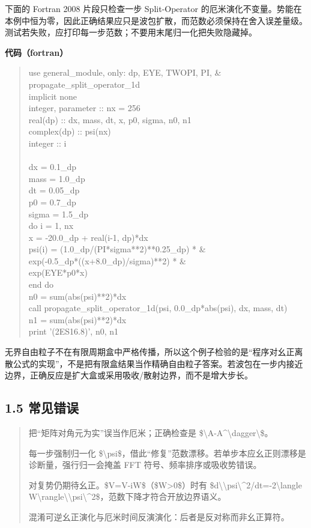 \documentclass[UTF8,openany,11pt,fontset=fandol]{ctexbook}
\begin{document}
下面的 Fortran 2008 片段只检查一步 Split-Operator
的厄米演化不变量。势能在本例中恒为零，因此正确结果应只是波包扩散，而范数必须保持在舍入误差量级。测试若失败，应打印每一步范数；不要用末尾归一化把失败隐藏掉。

\textbf{代码（fortran）}

\begin{quote}
use general\_module, only: dp, EYE, TWOPI, PI, \&\\
propagate\_split\_operator\_1d\\
implicit none\\
integer, parameter :: nx = 256\\
real(dp) :: dx, mass, dt, x, p0, sigma, n0, n1\\
complex(dp) :: psi(nx)\\
integer :: i\\
~\\
dx = 0.1\_dp\\
mass = 1.0\_dp\\
dt = 0.05\_dp\\
p0 = 0.7\_dp\\
sigma = 1.5\_dp\\
do i = 1, nx\\
x = -20.0\_dp + real(i-1, dp)*dx\\
psi(i) = (1.0\_dp/(PI*sigma**2)**0.25\_dp) * \&\\
exp(-0.5\_dp*((x+8.0\_dp)/sigma)**2) * \&\\
exp(EYE*p0*x)\\
end do\\
n0 = sum(abs(psi)**2)*dx\\
call propagate\_split\_operator\_1d(psi, 0.0\_dp*abs(psi), dx, mass,
dt)\\
n1 = sum(abs(psi)**2)*dx\\
print '(2ES16.8)', n0, n1
\end{quote}

无界自由粒子不在有限周期盒中严格传播，所以这个例子检验的是``程序对幺正离散公式的实现''，不是把有限盒结果当作精确自由粒子答案。若波包在一步内接近边界，正确反应是扩大盒或采用吸收/散射边界，而不是增大步长。

\subsection{\texorpdfstring{\textbf{1.5
常见错误}}{1.5 常见错误}}\label{ux5e38ux89c1ux9519ux8bef}

\begin{quote}
把``矩阵对角元为实''误当作厄米；正确检查是
\$\textbackslash\textbar A-A\^{}\textbackslash dagger\textbackslash\textbar\$。

每一步强制归一化
\$\textbackslash psi\$，借此``修复''范数漂移。若单步本应幺正则漂移是诊断量，强行归一会掩盖
FFT 符号、频率排序或吸收势错误。

对复势仍期待幺正。\$V=V-iW\$（\$W\textgreater0\$）时有
\$d\textbackslash\textbar\textbackslash psi\textbackslash\textbar\^{}2/dt=-2\textbackslash langle
W\textbackslash rangle\textbackslash\textbar\textbackslash psi\textbackslash\textbar\^{}2\$，范数下降才符合开放边界语义。

混淆可逆幺正演化与厄米时间反演演化：后者是反对称而非幺正算符。
\end{quote}
\end{document}

